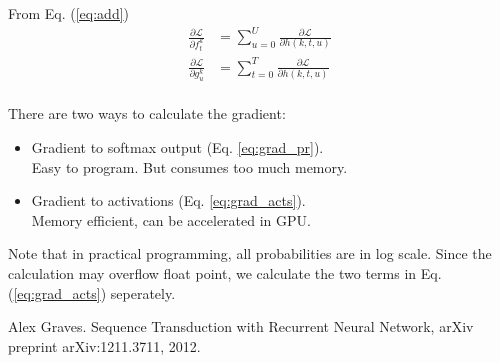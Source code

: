 \documentclass{article}
\begin{document}
From Eq. (\ref{eq:add})
\begin{equation}
    \begin{split}
        \frac{\partial \mathcal L}{\partial f_t^k} &= \sum_{u=0}^U \frac{\partial \mathcal L}{\partial h(k,t,u)} \\
        \frac{\partial \mathcal L}{\partial g_u^k} &= \sum_{t=0}^T \frac{\partial \mathcal L}{\partial h(k,t,u)} \\
    \end{split}
\end{equation}

There are two ways to calculate the gradient:
\begin{itemize}
    \item Gradient to softmax output (Eq. \ref{eq:grad_pr}). \\
    Easy to program. But consumes too much memory.
    \item Gradient to activations (Eq. \ref{eq:grad_acts}). \\
    Memory efficient, can be accelerated in GPU.
\end{itemize}
Note that in practical programming, all probabilities are in log scale. Since the calculation may overflow float point, we calculate the two terms in Eq. (\ref{eq:grad_acts}) seperately.

\begin{thebibliography}{1}
Alex Graves.
Sequence Transduction with Recurrent Neural Network,
arXiv preprint arXiv:1211.3711, 2012.
\end{thebibliography}
\end{document}
